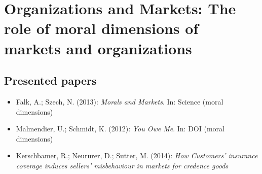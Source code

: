 

\chapter{Organizations and Markets: The role of moral dimensions of markets and organizations}

\section{Presented papers}

\begin{itemize}
	\item Falk, A.; Szech, N. (2013): \textit{Morals and Markets}. In: Science (moral dimensions)
	\item Malmendier, U.; Schmidt, K. (2012): \textit{You Owe Me}. In: DOI (moral dimensions)
	\item Kerschbamer, R.; Neururer, D.; Sutter, M. (2014): \textit{How Customers' insurance coverage induces sellers' misbehaviour in markets for credence goods}
\end{itemize}

\newpage